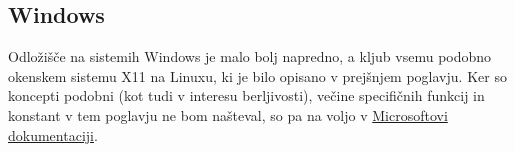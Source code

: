 \documentclass[12pt, A4]{article}
\begin{document}
	\noindent{}
	
	
	\subsection{Windows}
	Odložišče na sistemih Windows je malo bolj napredno, a kljub vsemu podobno okenskem sistemu X11 na Linuxu, ki je bilo opisano v prejšnjem poglavju. Ker so koncepti podobni (kot tudi v interesu berljivosti), večine specifičnih funkcij in konstant v tem poglavju ne bom našteval, so pa na voljo v \href{https://docs.microsoft.com/en-us/windows/win32/dataxchg/clipboard-reference}{Microsoftovi dokumentaciji}. \\
	
\end{document}
